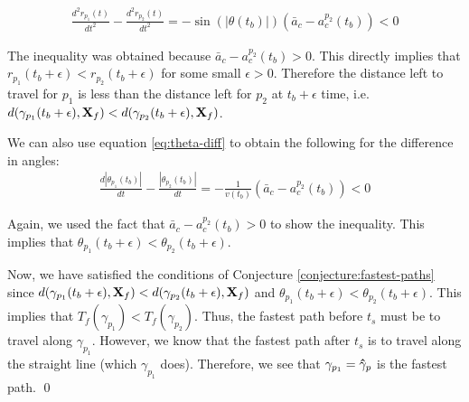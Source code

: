 \begin{eqnarray}
  \frac{d^2 r_{p_1}(t)}{d t^2} - \frac{d^2 r_{p_2}(t)}{d t^2} = - \sin(| \theta(t_b) |) \left( \bar{a}_c - a^{p_2}_c(t_b) \right) < 0
\end{eqnarray}

The inequality was obtained because $\bar{a}_c - a^{p_2}_c(t_b) > 0$. This directly implies that $r_{p_1}(t_b + \epsilon) < r_{p_2}(t_b + \epsilon)$ for some small $\epsilon > 0$. Therefore the distance left to travel for $p_1$ is less than the distance left for $p_2$ at $t_b + \epsilon$ time, i.e. $d(\gamma_{p_1}(t_b + \epsilon), \mathbf{X}_f) < d(\gamma_{p_2}(t_b + \epsilon), \mathbf{X}_f)$.

We can also use equation \ref{eq:theta-diff} to obtain the following for the difference in angles:
\begin{eqnarray}
  \frac{d | \theta_{p_1}(t_b) |}{dt} - \frac{ |\theta_{p_2} (t_b) |}{dt} = - \frac{1}{v(t_b)} \left(\bar{a}_c - a^{p_2}_c(t_b) \right) < 0
\end{eqnarray}

Again, we used the fact that $\bar{a}_c - a^{p_2}_c(t_b) > 0$ to show the inequality. This implies that $\theta_{p_1}(t_b + \epsilon) < \theta_{p_2}(t_b + \epsilon)$.

Now, we have satisfied the conditions of Conjecture \ref{conjecture:fastest-paths} since $d(\gamma_{p_1}(t_b + \epsilon), \mathbf{X}_f) < d(\gamma_{p_2}(t_b + \epsilon), \mathbf{X}_f)$ and $\theta_{p_1}(t_b + \epsilon) < \theta_{p_2}(t_b + \epsilon)$. This implies that $T_f(\gamma_{p_1}) < T_f(\gamma_{p_2})$. Thus, the fastest path before $t_s$ must be to travel along $\gamma_{p_1}$. However, we know that the fastest path after $t_s$ is to travel along the straight line (which $\gamma_{p_1}$ does). Therefore, we see that $\gamma_{p_1} = \mathbf{\hat{\gamma}}_p$ is the fastest path.
\qed
